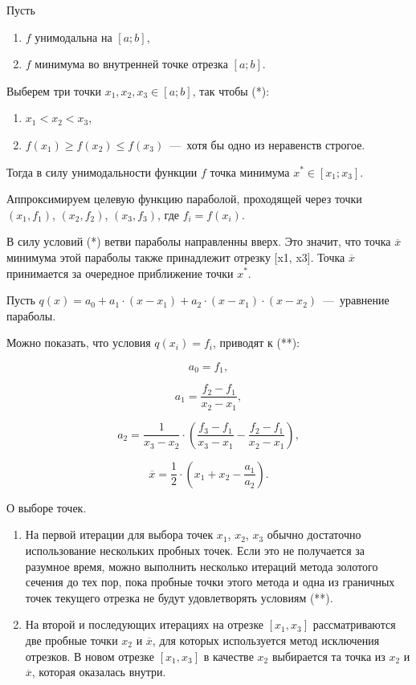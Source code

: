Пусть

\begin{enumerate}
	\item $f$ унимодальна на $[a; b]$,
	\item $f$ минимума во внутренней точке отрезка $[a; b]$.
\end{enumerate}

Выберем три точки $x_1, x_2, x_3 \in [a; b]$, так чтобы (*):

\begin{enumerate}
	\item $x_1 < x_2 < x_3$,
	\item $f(x_1) \ge f(x_2) \le f(x_3)$~---~хотя бы одно из неравенств строгое.
\end{enumerate}

Тогда в силу унимодальности функции $f$ точка минимума $x^{*} \in [x_1; x_3]$.

Аппроксимируем целевую функцию параболой, проходящей через точки $(x_1, f_1)$, $(x_2, f_2)$, $(x_3, f_3)$, где $f_i = f(x_i)$.

В силу условий (*) ветви параболы направленны вверх. Это значит, что точка $\overline{x}$ минимума этой параболы также принадлежит отрезку [x1, x3].
Точка $\overline{x}$ принимается за очередное приближение точки $x^{*}$.

Пусть $q(x) = a_0 + a_1 \cdot (x - x_1) + a_2 \cdot (x - x_1) \cdot (x - x_2)$~---~уравнение параболы.

Можно показать, что условия $q(x_i) = f_i$, приводят к (**):

\begin{equation*}
	a_0 = f_1,
\end{equation*}

\begin{equation*}
	a_1 = \frac{f_2 - f_1}{x_2 - x_1},
\end{equation*}

\begin{equation*}
	a_2 = \frac{1}{x_3 - x_2} \cdot \left( \frac{f_3 - f_1}{x_3 - x_1} - \frac{f_2 - f_1}{x_2 - x_1} \right),
\end{equation*}

\begin{equation*}
	\overline{x} = \frac{1}{2} \cdot \left( x_1 + x_2 - \frac{a_1}{a_2} \right).
\end{equation*}

О выборе точек.

\begin{enumerate}
	\item На первой итерации для выбора точек $x_1$, $x_2$, $x_3$ обычно достаточно использование нескольких пробных точек. Если это не получается за разумное время, можно выполнить несколько итераций метода золотого сечения до тех пор, пока пробные точки этого метода и одна из граничных точек текущего отрезка не будут удовлетворять условиям (**).
	\item На второй и последующих итерациях на отрезке $[x_1, x_3]$ рассматриваются две пробные точки $x_2$ и $\overline{x}$, для которых используется метод исключения отрезков. В новом отрезке $[x_1, x_3]$ в качестве $x_2$ выбирается та точка из $x_2$ и $\overline{x}$, которая оказалась внутри.
\end{enumerate}

